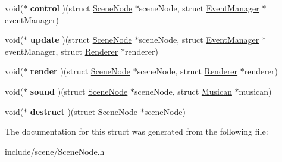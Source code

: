 \begin{DoxyCompactItemize}
void($\ast$ {\bfseries control} )(struct \hyperlink{struct_scene_node}{Scene\+Node} $\ast$scene\+Node, struct \hyperlink{struct_event_manager}{Event\+Manager} $\ast$event\+Manager)
\item 
\hypertarget{struct_scene_node_a6f53df0be4e8b1ea881a1612fecc6fd6}{}\label{struct_scene_node_a6f53df0be4e8b1ea881a1612fecc6fd6} 
void($\ast$ {\bfseries update} )(struct \hyperlink{struct_scene_node}{Scene\+Node} $\ast$scene\+Node, struct \hyperlink{struct_event_manager}{Event\+Manager} $\ast$event\+Manager, struct \hyperlink{struct_renderer}{Renderer} $\ast$renderer)
\item 
\hypertarget{struct_scene_node_addb4ef28bccaae82a75ab780569a3b58}{}\label{struct_scene_node_addb4ef28bccaae82a75ab780569a3b58} 
void($\ast$ {\bfseries render} )(struct \hyperlink{struct_scene_node}{Scene\+Node} $\ast$scene\+Node, struct \hyperlink{struct_renderer}{Renderer} $\ast$renderer)
\item 
\hypertarget{struct_scene_node_a2157f5f26dcdffd419c5c675961e9a8a}{}\label{struct_scene_node_a2157f5f26dcdffd419c5c675961e9a8a} 
void($\ast$ {\bfseries sound} )(struct \hyperlink{struct_scene_node}{Scene\+Node} $\ast$scene\+Node, struct \hyperlink{struct_musican}{Musican} $\ast$musican)
\item 
\hypertarget{struct_scene_node_a33da6753937fe159afc33054641a556f}{}\label{struct_scene_node_a33da6753937fe159afc33054641a556f} 
void($\ast$ {\bfseries destruct} )(struct \hyperlink{struct_scene_node}{Scene\+Node} $\ast$scene\+Node)
\end{DoxyCompactItemize}


The documentation for this struct was generated from the following file\+:\begin{DoxyCompactItemize}
\item 
include/scene/Scene\+Node.\+h\end{DoxyCompactItemize}

